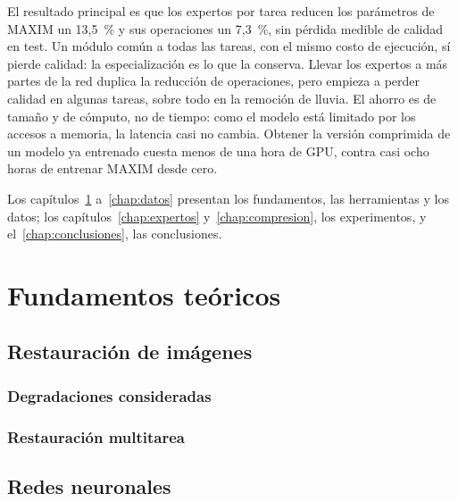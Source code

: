 \documentclass[
  11pt,
  oneside,
  english,
  spanish,
  singlespacing,
  headsepline
]{MastersDoctoralThesis}
\begin{document}
El resultado principal es que los expertos por tarea reducen los parámetros de MAXIM un 13,5~\% y sus operaciones un 7,3~\%, sin pérdida medible de calidad en test. Un módulo común a todas las tareas, con el mismo costo de ejecución, sí pierde calidad: la especialización es lo que la conserva. Llevar los expertos a más partes de la red duplica la reducción de operaciones, pero empieza a perder calidad en algunas tareas, sobre todo en la remoción de lluvia. El ahorro es de tamaño y de cómputo, no de tiempo: como el modelo está limitado por los accesos a memoria, la latencia casi no cambia. Obtener la versión comprimida de un modelo ya entrenado cuesta menos de una hora de GPU, contra casi ocho horas de entrenar MAXIM desde cero.

Los capítulos~\ref{chap:fundamentos-teoricos} a~\ref{chap:datos} presentan los fundamentos, las herramientas y los datos; los capítulos~\ref{chap:expertos} y~\ref{chap:compresion}, los experimentos, y el~\ref{chap:conclusiones}, las conclusiones.

\chapter{Fundamentos teóricos}
\label{chap:fundamentos-teoricos}


\section{Restauración de imágenes}
\label{sec:restauracion}

\subsection{Degradaciones consideradas}
\label{sec:degradaciones}

\subsection{Restauración multitarea}
\label{sec:multitarea}

\section{Redes neuronales}
\label{sec:redes-neuronales}
\end{document}
